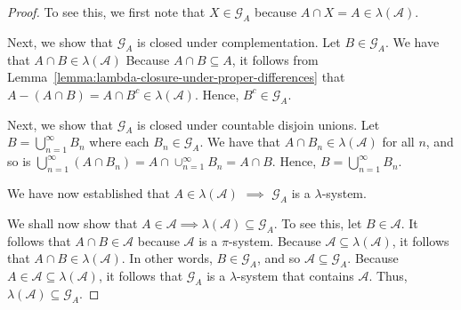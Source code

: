 \documentclass[10pt]{article}
\newcommand{\mcal}[1]{\mathcal{#1}}
\begin{document}
\begin{itemize}
\begin{proof}
    To see this, we first note that $X \in \mcal{G}_A$ because $A \cap X = A \in \lambda(\mcal{A})$. 
    
    Next, we show that $\mcal{G}_A$ is closed under complementation. Let $B \in \mcal{G}_A$. We have that $A \cap B \in \lambda(\mcal{A})$ Because $A \cap B \subseteq A$, it follows from Lemma~\ref{lemma:lambda-closure-under-proper-differences} that $A - (A \cap B) = A \cap B^c \in \lambda(\mcal{A})$. Hence, $B^c \in \mcal{G}_A$.

    Next, we show that $\mcal{G}_A$ is closed under countable disjoin unions. Let $B = \bigcup_{n=1}^\infty B_n$ where each $B_n \in \mcal{G}_A$. We have that $A \cap B_n \in \lambda(\mcal{A})$ for all $n$, and so is $\bigcup_{n=1}^\infty (A \cap B_n) = A \cap \cup_{n=1}^\infty B_n = A \cap B$. Hence, $B = \bigcup_{n=1}^\infty B_n$.

    We have now established that $A \in \lambda(\mcal{A})$ $\implies$ $\mcal{G}_A$ is a $\lambda$-system.

    We shall now show that $A \in \mcal{A} \implies \lambda(\mcal{A}) \subseteq \mcal{G}_A$. To see this, let $B \in \mcal{A}$. It follows that $A \cap B \in \mcal{A}$ because $\mcal{A}$ is a $\pi$-system. Because $\mcal{A} \subseteq \lambda(\mcal{A})$, it follows that $A \cap B \in \lambda(\mcal{A})$. In other words, $B \in \mcal{G}_A$, and so $\mcal{A} \subseteq \mcal{G}_A$. Because $A \in \mcal{A} \subseteq \lambda(\mcal{A})$, it follows that $\mcal{G}_A$ is a $\lambda$-system that contains $\mcal{A}$. Thus, $\lambda(\mcal{A}) \subseteq \mcal{G}_A$.


\end{proof}
\end{itemize}
\end{document}
